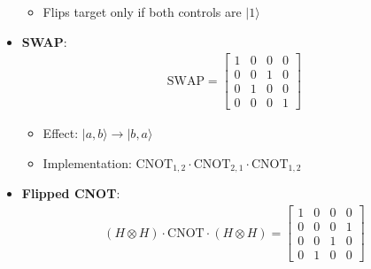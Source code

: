 \begin{multicols}{3}
\begin{itemize}[leftmargin=*,nosep,topsep=0pt]
\begin{itemize}[nosep]
          \item Flips target only if both controls are $|1\rangle$
        \end{itemize}
      \item \textbf{SWAP}:
        \begin{align*}
          \text{SWAP} = \begin{bmatrix}
            1 & 0 & 0 & 0 \\
            0 & 0 & 1 & 0 \\
            0 & 1 & 0 & 0 \\
            0 & 0 & 0 & 1
          \end{bmatrix}
        \end{align*}
        \begin{itemize}[nosep]
          \item Effect: $|a,b\rangle \to |b,a\rangle$
          \item Implementation: $\text{CNOT}_{1,2} \cdot \text{CNOT}_{2,1} \cdot \text{CNOT}_{1,2}$
        \end{itemize}
      \item \textbf{Flipped CNOT}:
        \begin{align*}
          (H \otimes H) \cdot \text{CNOT} \cdot (H \otimes H) = \begin{bmatrix}
            1 & 0 & 0 & 0 \\
            0 & 0 & 0 & 1 \\
            0 & 0 & 1 & 0 \\
            0 & 1 & 0 & 0
          \end{bmatrix}
        \end{align*}
    \end{itemize}


\end{multicols}
